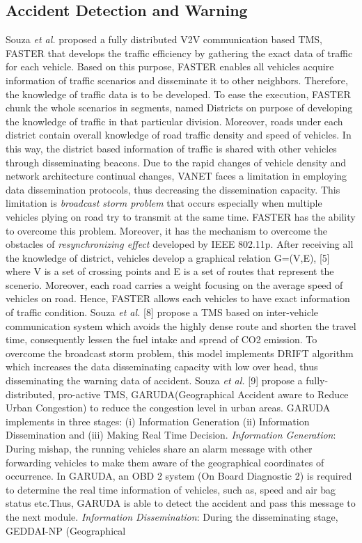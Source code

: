 \documentclass[conference]{IEEEtran}
\begin{document}
\subsection{Accident Detection and Warning}
Souza \textit{et al.} \cite{de2016fully} proposed a fully distributed V2V communication based TMS, FASTER that develops the traffic efficiency by gathering the exact data of traffic for each vehicle. Based on this purpose, FASTER enables all vehicles acquire information of traffic scenarios and disseminate it to other neighbors. Therefore, the knowledge of traffic data is to be developed. To ease the execution, FASTER chunk  the whole scenarios in segments, named Districts on purpose of developing the knowledge of traffic in that particular division.  Moreover, roads under each district contain overall knowledge of road traffic density and speed of vehicles.  In this way, the district based information of traffic is shared with other vehicles through disseminating beacons. Due to the rapid changes of vehicle density and network architecture continual changes, VANET faces a limitation in employing data dissemination protocols, thus decreasing the dissemination capacity. This limitation is \textit{broadcast storm problem} \cite{souza2014add} that occurs especially when multiple vehicles plying on road try to transmit at the same time. FASTER has the ability to overcome this problem. Moreover, it has the mechanism to overcome the obstacles of \textit{resynchronizing effect} \cite{souza2014add} developed by IEEE 802.11p. After receiving all the knowledge of district, vehicles develop a graphical relation G=(V,E), [5] where V is a set of crossing points and E is a set of routes that represent the scenerio. Moreover, each road carries a weight focusing on the average speed of vehicles on road. Hence, FASTER allows each vehicles to have exact information of traffic condition.
Souza \textit{et al.} [8] propose a TMS based on inter-vehicle communication system which avoids the highly dense route and shorten the travel time, consequently lessen the fuel intake and spread of CO2 emission. To overcome the broadcast storm problem, this model implements DRIFT algorithm which increases the data disseminating capacity with low over head, thus disseminating the warning data of accident. 
Souza \textit{et al.} [9] propose a fully-distributed, pro-active TMS, GARUDA(Geographical
Accident aware to Reduce Urban Congestion) to reduce the congestion level in urban areas. GARUDA implements in three stages: (i) Information Generation (ii) Information Dissemination and (iii) Making Real Time Decision. \textit{Information Generation}: During mishap, the running vehicles share an alarm message with other forwarding vehicles to make them aware of the geographical coordinates of occurrence. In GARUDA, an OBD 2 system (On Board Diagnostic 2) is required to determine the real time information of vehicles, such as, speed and air bag status etc.Thus, GARUDA is able to detect the accident and pass this message to the next module. \textit{Information Dissemination}: During the disseminating stage, GEDDAI-NP (Geographical
\end{document}

